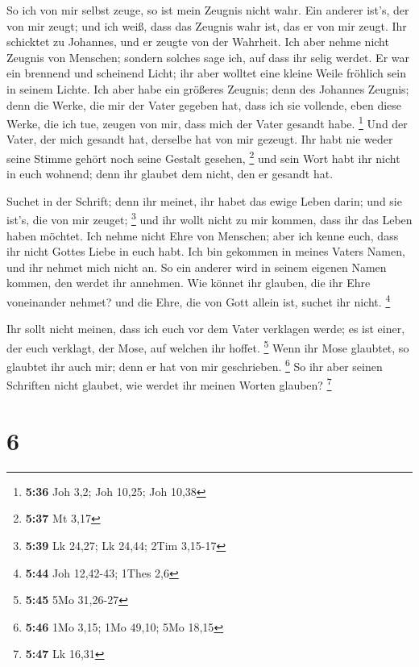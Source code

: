  So ich von mir selbst zeuge, so ist mein Zeugnis nicht
wahr.  Ein anderer ist's, der von mir zeugt; und ich weiß,
dass das Zeugnis wahr ist, das er von mir zeugt.  Ihr
schicktet zu Johannes, und er zeugte von der Wahrheit.  Ich
aber nehme nicht Zeugnis von Menschen; sondern solches sage ich, auf
dass ihr selig werdet.  Er war ein brennend und scheinend
Licht; ihr aber wolltet eine kleine Weile fröhlich sein in seinem
Lichte.  Ich aber habe ein größeres Zeugnis; denn des
Johannes Zeugnis; denn die Werke, die mir der Vater gegeben hat, dass
ich sie vollende, eben diese Werke, die ich tue, zeugen von mir, dass
mich der Vater gesandt habe. \footnote{\textbf{5:36} Joh 3,2; Joh 10,25;
  Joh 10,38}  Und der Vater, der mich gesandt hat, derselbe
hat von mir gezeugt. Ihr habt nie weder seine Stimme gehört noch seine
Gestalt gesehen, \footnote{\textbf{5:37} Mt 3,17}  und sein
Wort habt ihr nicht in euch wohnend; denn ihr glaubet dem nicht, den er
gesandt hat.

 Suchet in der Schrift; denn ihr meinet, ihr habet das
ewige Leben darin; und sie ist's, die von mir zeuget; \footnote{\textbf{5:39}
  Lk 24,27; Lk 24,44; 2Tim 3,15-17}  und ihr wollt nicht zu
mir kommen, dass ihr das Leben haben möchtet.  Ich nehme
nicht Ehre von Menschen;  aber ich kenne euch, dass ihr
nicht Gottes Liebe in euch habt.  Ich bin gekommen in
meines Vaters Namen, und ihr nehmet mich nicht an. So ein anderer wird
in seinem eigenen Namen kommen, den werdet ihr annehmen. 
Wie könnet ihr glauben, die ihr Ehre voneinander nehmet? und die Ehre,
die von Gott allein ist, suchet ihr nicht. \footnote{\textbf{5:44} Joh
  12,42-43; 1Thes 2,6}

 Ihr sollt nicht meinen, dass ich euch vor dem Vater
verklagen werde; es ist einer, der euch verklagt, der Mose, auf welchen
ihr hoffet. \footnote{\textbf{5:45} 5Mo 31,26-27}  Wenn ihr
Mose glaubtet, so glaubtet ihr auch mir; denn er hat von mir
geschrieben. \footnote{\textbf{5:46} 1Mo 3,15; 1Mo 49,10; 5Mo 18,15}
 So ihr aber seinen Schriften nicht glaubet, wie werdet ihr
meinen Worten glauben? \footnote{\textbf{5:47} Lk 16,31}

\hypertarget{section-3}{%
\section{6}\label{section-3}}


